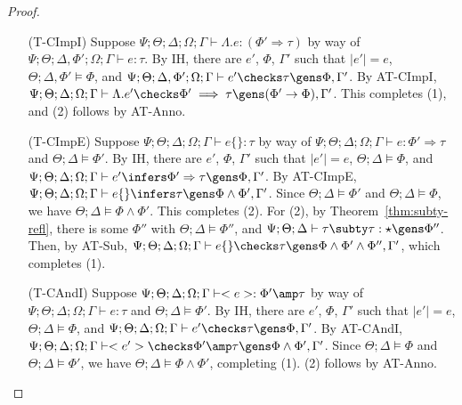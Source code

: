 \begin{proof}
\begin{itemize}
  \item[(T-CImpI)] Suppose
  $\Psi ; \Theta ; \Delta ; \Omega ; \Gamma \vdash \Lambda .e : (\Phi' \Rightarrow \tau)$ by way of
  $\Psi ; \Theta ; \Delta,\Phi' ; \Omega ; \Gamma \vdash e : \tau$.
  By IH, there are $e'$, $\Phi$, $\Gamma'$ such that
  $|e'| = e$,
  $\Theta ; \Delta,\Phi' \vDash \Phi$, and
  $\Psi ; \Theta ; \Delta,\Phi'; \Omega ; \Gamma \vdash e' \checks \tau \gens \Phi,\Gamma'$.
  By AT-CImpI,
  $\Psi ; \Theta ; \Delta ; \Omega ; \Gamma \vdash \Lambda. e' \checks \Phi' \implies \tau \gens (\Phi' \to \Phi),\Gamma'$.
  This completes (1), and (2) follows by AT-Anno.
  
  \item[(T-CImpE)] Suppose
  $\Psi ; \Theta ; \Delta ; \Omega ; \Gamma \vdash e \{\} : \tau$ by way of
  $\Psi ; \Theta ; \Delta ; \Omega ; \Gamma \vdash e : \Phi' \Rightarrow \tau$ and
  $\Theta ; \Delta \vDash \Phi'$.
  By IH, there are $e'$, $\Phi$, $\Gamma'$ such that
  $|e'| = e$,
  $\Theta ; \Delta \vDash \Phi$, and
  $\Psi ; \Theta ; \Delta ; \Omega ; \Gamma \vdash e' \infers \Phi' \Rightarrow \tau \gens \Phi,\Gamma'$.
  By AT-CImpE,
  $\Psi ; \Theta ; \Delta ; \Omega ; \Gamma \vdash e \{\} \infers \tau \gens \Phi \wedge \Phi',\Gamma'$.
  Since $\Theta ; \Delta \vDash \Phi'$ and $\Theta ; \Delta \vDash \Phi$, we have $\Theta ; \Delta \vDash \Phi \wedge \Phi'$.
  This completes (2). For (2),
  by Theorem~\ref{thm:subty-refl}, there is some $\Phi''$ with
  $\Theta ; \Delta \vDash \Phi''$, and
  $\Psi ; \Theta ; \Delta \vdash \tau \subty \tau : \star \gens \Phi''$.
  Then, by AT-Sub,
  $\Psi ; \Theta ; \Delta ; \Omega ; \Gamma \vdash e \{\} \checks \tau \gens \Phi \wedge \Phi' \wedge \Phi'',\Gamma'$,
  which completes (1).
  
  \item[(T-CAndI)] Suppose
  $\Psi ; \Theta ; \Delta ; \Omega ; \Gamma \vdash <e> : \Phi' \amp \tau$ by way of
  $\Psi ; \Theta ; \Delta ; \Omega ; \Gamma \vdash e : \tau$ and
  $\Theta ; \Delta \vDash \Phi'$.
  By IH, there are $e'$, $\Phi$, $\Gamma'$ such that
  $|e'| = e$,
  $\Theta ; \Delta \vDash \Phi$, and
  $\Psi  ; \Theta ; \Delta ; \Omega ; \Gamma \vdash e' \checks \tau \gens \Phi,\Gamma'$.
  By AT-CAndI,
  $\Psi; \Theta ; \Delta ; \Omega ; \Gamma \vdash <e'> \checks \Phi' \amp \tau \gens \Phi \wedge \Phi',\Gamma'$.
  Since $\Theta ; \Delta \vDash \Phi$ and $\Theta ; \Delta \vDash \Phi'$, we have $\Theta ; \Delta \vDash \Phi \wedge \Phi'$,
  completing (1). (2) follows by AT-Anno.
  

\end{itemize}
\end{proof}
